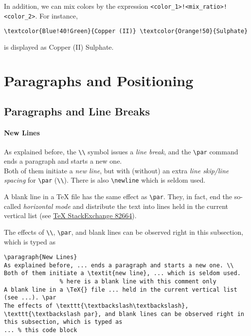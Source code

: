 In addition, we can mix colors by the expression \texttt{<color\_1>!<mix\_ratio>!\allowbreak <color\_2>}. For instance,
\begin{lstlisting}
\textcolor{Blue!40!Green}{Copper (II)} \textcolor{Orange!50}{Sulphate}
\end{lstlisting}
is displayed as \textcolor{Blue!40!Green}{Copper (II)} \textcolor{Orange!50}{Sulphate}.

\section{Paragraphs and Positioning}

\subsection{Paragraphs and Line Breaks}

\paragraph{New Lines}
As explained before, the \texttt{\textbackslash\textbackslash} symbol issues a \textit{line break}, and the \texttt{\textbackslash par} command ends a paragraph and starts a new one. \\
Both of them initiate a \textit{new line}, but with (without) an extra \textit{line skip/line spacing} for \texttt{\textbackslash par} (\texttt{\textbackslash\textbackslash}). There is also \texttt{\textbackslash newline} which is seldom used.
    
A blank line in a \TeX{} file has the same effect as \texttt{\textbackslash par}. They, in fact, end the so-called \textit{horizontal mode} and distribute the text into lines held in the current vertical list (see \href{https://tex.stackexchange.com/questions/82664/when-to-use-par-and-when-newline-or-blank-lines}{\TeX{} StackExchange 82664}). \par 
The effects of \texttt{\textbackslash\textbackslash}, \texttt{\textbackslash par}, and blank lines can be observed right in this subsection, which is typed as
\begin{lstlisting}
\paragraph{New Lines}
As explained before, ... ends a paragraph and starts a new one. \\
Both of them initiate a \textit{new line}, ... which is seldom used.
                % here is a blank line with this comment only
A blank line in a \TeX{} file ... held in the current vertical list (see ...). \par
The effects of \texttt{\textbackslash\textbackslash}, \texttt{\textbackslash par}, and blank lines can be observed right in this subsection, which is typed as
... % this code block
\end{lstlisting}

